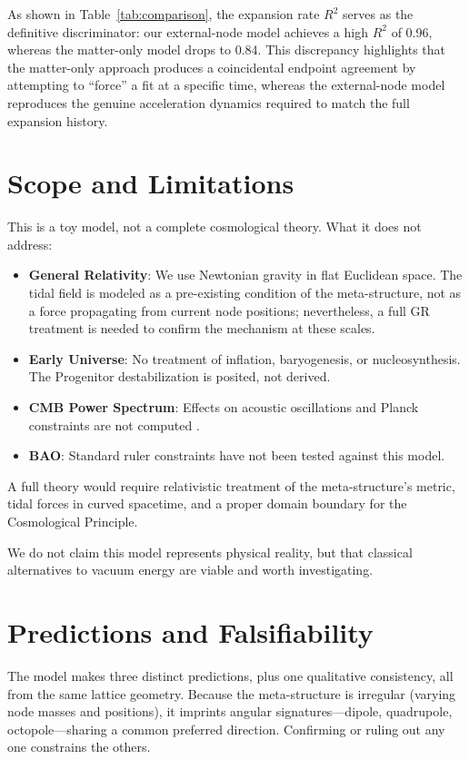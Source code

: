 \documentclass{article}
\begin{document}
As shown in Table~\ref{tab:comparison}, the expansion rate $R^2$ serves as the definitive discriminator: our external-node model achieves a high $R^2$ of 0.96, whereas the matter-only model drops to 0.84. This discrepancy highlights that the matter-only approach produces a coincidental endpoint agreement by attempting to ``force'' a fit at a specific time, whereas the external-node model reproduces the genuine acceleration dynamics required to match the full expansion history.

\section{Scope and Limitations}
\label{sec:scope}
\label{sec:limitations}

This is a toy model, not a complete cosmological theory.
What it does not address:
\begin{itemize}
\item \textbf{General Relativity}: We use Newtonian gravity in flat Euclidean space. The tidal field is modeled as a pre-existing condition of the meta-structure, not as a force propagating from current node positions; nevertheless, a full GR treatment is needed to confirm the mechanism at these scales.
\item \textbf{Early Universe}: No treatment of inflation, baryogenesis, or nucleosynthesis. The Progenitor destabilization is posited, not derived.
\item \textbf{CMB Power Spectrum}: Effects on acoustic oscillations and Planck constraints are not computed \cite{Planck2020}.
\item \textbf{BAO}: Standard ruler constraints \cite{Eisenstein2005} have not been tested against this model.
\end{itemize}

\noindent A full theory would require relativistic treatment of the meta-structure's metric, tidal forces in curved spacetime, and a proper domain boundary for the Cosmological Principle.

We do not claim this model represents physical reality, but that classical alternatives to vacuum energy are viable and worth investigating.

\section{Predictions and Falsifiability}
\label{sec:predictions}
The model makes three distinct predictions, plus one qualitative consistency, all from the same lattice geometry.
Because the meta-structure is irregular (varying node masses and positions), it imprints angular signatures—dipole, quadrupole, octopole—sharing a common preferred direction.
Confirming or ruling out any one constrains the others.
\end{document}

